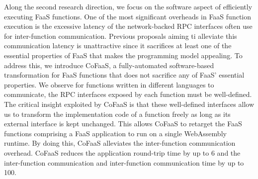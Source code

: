 \documentclass[../main.tex]{subfiles}
\begin{document}
Along the second research direction, we focus on the software aspect
of efficiently executing FaaS functions. One of the most significant
overheads in FaaS function execution is the excessive latency of the
network-backed RPC interfaces often use for inter-function
communication. Previous proposals aiming ti alleviate this
communication latency is unattractive since it sacrifices at least one
of the essential properties of FaaS that makes the programming model
appealing. To address this, we introduce CoFaaS, a fully-automated
software-based transformation for FaaS functions that does not
sacrifice any of FaaS' essential properties. We observe for functions
written in different languages to communicate, the RPC interfaces
exposed by each function must be well-defined. The critical insight
exploited by CoFaaS is that these well-defined interfaces allow us to
transform the implementation code of a function freely as long as its
external interface is kept unchanged. This allows CoFaaS to retarget
the FaaS functions comprising a FaaS application to run on a single
WebAssembly runtime. By doing this, CoFaaS alleviates the
inter-function communication overhead. CoFaaS reduces the application
round-trip time by up to 6\texttimes{} and the inter-function
communication and inter-function communication time by up to
100\texttimes{}.
\end{document}
